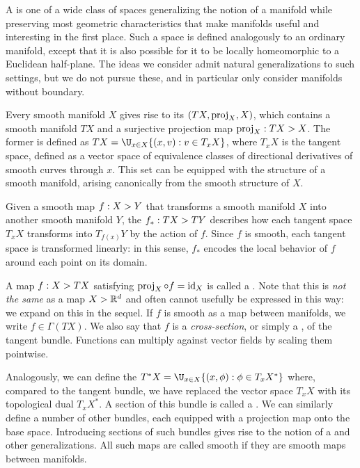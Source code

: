 \documentclass[11pt]{book}
\begin{document}
A  is one of a wide class of spaces generalizing the notion of a manifold while preserving most geometric characteristics that make manifolds useful and interesting in the first place.
Such a space is defined analogously to an ordinary manifold, except that it is also possible for it to be locally homeomorphic to a Euclidean half-plane.
The ideas we consider admit natural generalizations to such settings, but we do not pursue these, and in particular only consider manifolds without boundary.

\label{ntn:tangent-bdl}
Every smooth manifold $X$ gives rise to its  $(TX,\operatorname{proj}_X,X)$, which contains a smooth manifold $TX$ and a surjective projection map $\operatorname{proj}_X : TX \-> X$.
The former is defined as $TX = \U_{x\in X} \{(x,v) : v \in T_x X\}$, where $T_x X$ is the tangent space, defined as a vector space of equivalence classes of directional derivatives of smooth curves through $x$.
This set can be equipped with the structure of a smooth manifold, arising canonically from the smooth structure of $X$.

\label{ntn:vector-pushforward}
Given a smooth map $f: X \-> Y$ that transforms a smooth manifold $X$ into another smooth manifold $Y$, the  $f_* : TX \-> TY$ describes how each tangent space $T_x X$ transforms into $T_{f(x)} Y$ by the action of $f$.
Since $f$ is smooth, each tangent space is transformed linearly: in this sense, $f_*$ encodes the local behavior of $f$ around each point on its domain.

\label{ntn:smooth-sections}
A map $f : X \-> TX$ satisfying $\operatorname{proj}_X \circ f = \operatorname{id}_X$ is called a .
Note that this is \emph{not the same} as a map $X \-> \mathbb{R}^d$ and often cannot usefully be expressed in this way: we expand on this in the sequel.
If $f$ is smooth as a map between manifolds, we write $f \in \Gamma(TX)$.
We also say that $f$ is a \emph{cross-section}, or simply a , of the tangent bundle.
Functions can multiply against vector fields by scaling them pointwise.

\label{ntn:cotangent-bdl}
Analogously, we can define the  $T^* X = \U_{x\in X} \{(x,\phi) : \phi \in T_x X^*\}$ where, compared to the tangent bundle, we have replaced the vector space $T_x X$ with its topological dual $T_x X^*$.
A section of this bundle is called a .
We can similarly define a number of other bundles, each equipped with a projection map onto the base space.
Introducing sections of such bundles gives rise to the notion of a  and other generalizations.
All such maps are called smooth if they are smooth maps between manifolds.
\end{document}
